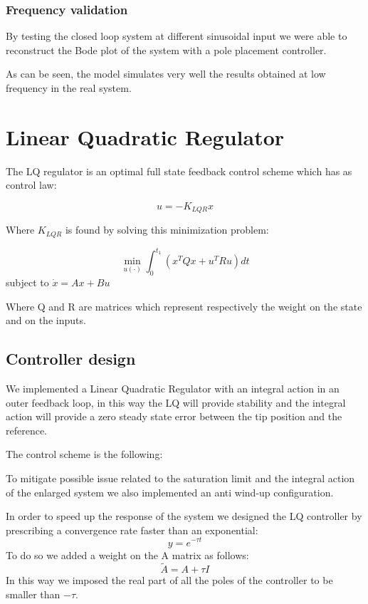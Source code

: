 \subsubsection{Frequency validation}
By testing the closed loop system at different sinusoidal input we were able to reconstruct the Bode plot of the system with a pole placement controller.


As can be seen, the model simulates very well the results obtained at low frequency in the real system.


\section{Linear Quadratic Regulator}

The LQ regulator is an optimal full state feedback control scheme which has as control law:

\begin{equation*}
    u = -K_{LQR}x
\end{equation*}

Where $K_{LQR}$ is found by solving this minimization problem:


$$ \min _{u(\cdot)} \int_0^{t_1}\left(x^T Q x+u^T R u\right) d t $$ 
subject to $\dot{x}=A x+B u$ 

Where Q and R are matrices which represent respectively the weight on the state and on the inputs.

\subsection{Controller design}

We implemented a Linear Quadratic Regulator with an integral action in an outer feedback loop, in this way the LQ will provide stability and the integral action will provide a zero steady state error between the tip position and the reference.

The control scheme is the following:


To mitigate possible issue related to the saturation limit and the integral action of the enlarged system we also implemented an anti wind-up configuration.

In order to speed up the response of the system we designed the LQ controller by prescribing a convergence rate faster than an exponential:
\[
y =  e^{-\tau t} \]
To do so we added a weight on the A matrix as follows:
\[
    \tilde{A} = A + \tau I\]
In this way we imposed the real part of all the poles of the controller to be smaller than $ -\tau$.

